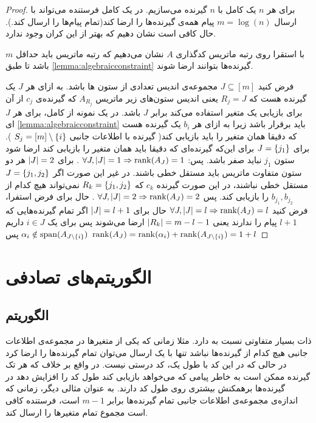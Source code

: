 \begin{proof}
    برای هر
    $n$
    یک
    \lpicod
    کامل با
    $n$
    گیرنده می‌سازیم. در یک
    \lpicod
    کامل فرستنده می‌تواند با ارسال
    $m = \log(n)$
    پیام همه‌ی گیرنده‌ها را ارضا کند(تمام پیام‌ها را ارسال کند.). حال کافی است نشان دهیم که بهتر از این کران وجود ندارد.

    با استقرا روی رتبه ماتریس کدگذاری
    $A$
    نشان می‌دهیم که رتبه ماتریس باید حداقل
    $m$
    باشد تا طبق
    \autoref{lemma:algebraicconstraint}
    گیرنده‌ها بتوانند ارضا شوند.

    فرض کنید
    $J \subseteq [m]$
    مجموعه‌ی اندیس تعدادی از ستون ها باشد. به ازای هر
    $J$
    یک گیرنده هست که
    $R_j = J$
    یعنی اندیس ستون‌های زیر ماتریس
    $A_{R_j}$
    که گیرنده‌ی
    $c_j$
    از آن برای بازیابی یک متغیر استفاده می‌کند برابر
    $J$
    باشد. در یک نمونه از
    \lpicod
    کامل، برای هر
    $J$
    ای
    \autoref{lemma:algebraicconstraint}
    باید برقرار باشد زیرا به ازای هر
    $b_i$
    یک گیرنده هست که دقیقا همان متغیر را باید بازیابی کند(
    گیرنده با اطلاعات جانبی
    $S_j = [m] \setminus \left\{ i \right\}$
    ). برای
    $J = \left\{ j_1 \right\}$
    برای این‌که گیرنده‌ای که دقیقا باید همان متغیر را بازیابی کند ارضا شود ستون
    $j_1$
    نباید صفر باشد. پس:
    $\forall J, \left|{J}\right| = 1 \Rightarrow \operatorname{rank}(A_J) = 1$
    . برای
    $\left|{J}\right| = 2$
    هر دو ستون متفاوت ماتریس باید مستقل خطی باشند. در غیر این صورت اگر
    $J = \left\{ j_1, j_2 \right\}$
    مستقل خطی نباشند، در این صورت گیرنده‌
    $c_k$
    که
    $R_k = \left\{ j_1, j_2 \right\}$
    نمی‌تواند هیچ کدام از
    $b_{j_1}, b_{j_2}$
    را بازیابی کند. پس
    $\forall J, \left|{J}\right| = 2 \Rightarrow \operatorname{rank}(A_J) = 2$
    . حال برای فرض استفرا، فرض کنید
    $\forall J, \left|{J}\right| = l \Rightarrow \operatorname{rank}(A_J) = l$
    حال برای
    $\left|{J}\right| = l + 1$
    اگر تمام گیرنده‌هایی که
    $l + 1$
    پیام را ندارند یعنی
    $\left|{R_k}\right| = m - l - 1 $
    ارضا می‌شوند پس برای یک
    $i \in J$
    داریم
    $\alpha_i \notin \operatorname{span}(A_{J \setminus \left\{ i \right\}})$
    پس
    $\operatorname{rank}(A_{J}) = \operatorname{rank}(\alpha_i) + \operatorname{rank}(A_{J \setminus \left\{ i \right\}}) = 1 + l$
\end{proof}


\section{الگوریتم‌های تصادفی}

\subsection{الگوریتم  }
\picod
ذات بسیار متفاوتی نسبت به
\icod
دارد. مثلا زمانی که یکی از متغیرها در مجموعه‌ی اطلاعات جانبی هیچ کدام از گیرنده‌ها نباشد تنها با یک ارسال می‌توان تمام گیرنده‌ها را ارضا کرد در حالی که در
\icod
این کد با طول یک، کد درستی نیست. در واقع بر خلاف
\icod
که هر تک گیرنده ممکن است به خاطر پیامی که می‌خواهد بازیابی کند طول کد را افزایش دهد در
\picod
گیرنده‌ها برهمکنش بیشتری روی طول کد دارند. به عنوان مثالی دیگر، زمانی که اندازه‌ی مجموعه‌ی اطلاعات جانبی تمام گیرنده‌ها برابر
$m - 1$
است، فرستنده کافی است مجموع تمام متغیرها را ارسال کند.

